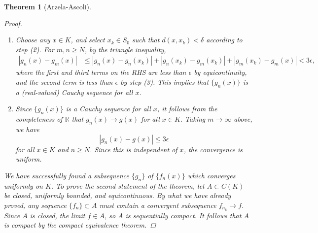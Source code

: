 \documentclass[12pt]{amsart}         %
\newtheorem{theorem}{Theorem}[section]
\theoremstyle{remark}
\newcommand{\R}{\mathbb{R}}
\begin{document}
\begin{theorem}[Arzela-Ascoli]
\begin{proof}
\begin{enumerate}
    \item Choose any $x \in K$, and select $x_k \in S_0$ such that $d(x, x_k) < \delta$ according to step (2). For $m, n \geq N$, by the triangle inequality,
    \begin{align*}
    |g_n(x) - g_m(x)| &\leq |g_n(x) - g_n(x_k)| +
    |g_n(x_k) - g_m(x_k)| + |g_m(x_k) - g_m(x)| < 3\epsilon,
    \end{align*}
    where the first and third terms on the RHS are less than $\epsilon$ by equicontinuity, and the second term is less than $\epsilon$ by step (3). This implies that $\{g_n(x)\}$ is a (real-valued) Cauchy sequence for all $x$.
    \item Since $\{g_n(x)\}$ is a Cauchy sequence for all $x$, it follows from the completeness of $\R$ that $g_n(x) \rightarrow g(x)$ for all $x \in K$. Taking $m \rightarrow \infty$ above, we have
    \[
    |g_n(x) - g(x)| \leq 3\epsilon
    \]
    for all $x \in K$ and $n \geq N$. Since this is independent of $x$, the convergence is uniform.
    \end{enumerate}
We have successfully found a subsequence $\{g_n\}$ of $\{f_n(x)\}$ which converges uniformly on $K$. To prove the second statement of the theorem, let $A \subset C(K)$ be closed, uniformly bounded, and equicontinuous. By what we have already proved, any sequence $\{f_n\}\subset A$ must contain a convergent subsequence $f_{n_k} \rightarrow f$. Since $A$ is closed, the limit $f \in A$, so $A$ is sequentially compact. It follows that $A$ is compact by the compact equivalence theorem.
\end{proof}
\end{theorem}
\end{document}
